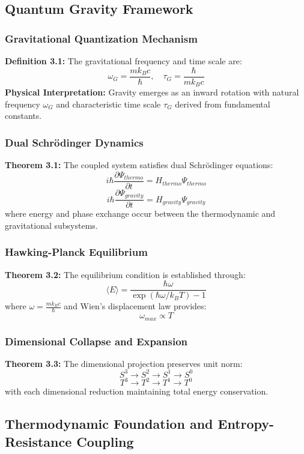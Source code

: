﻿\documentclass[12pt]{article}
\begin{document}
\subsection{Quantum Gravity Framework}

\subsubsection{Gravitational Quantization Mechanism}
\textbf{Definition 3.1:} The gravitational frequency and time scale are:
$$\omega_G = \frac{m k_B c}{\hbar}, \quad \tau_G = \frac{\hbar}{m k_B c}$$
\textbf{Physical Interpretation:} Gravity emerges as an inward rotation with natural frequency $\omega_G$ and characteristic time scale $\tau_G$ derived from fundamental constants.

\subsubsection{Dual Schr\"odinger Dynamics}
\textbf{Theorem 3.1:} The coupled system satisfies dual Schr\"odinger equations:
$$i\hbar \frac{\partial \Psi_{thermo}}{\partial t} = H_{thermo} \Psi_{thermo}$$
$$i\hbar \frac{\partial \Psi_{gravity}}{\partial t} = H_{gravity} \Psi_{gravity}$$
where energy and phase exchange occur between the thermodynamic and gravitational subsystems.

\subsubsection{Hawking-Planck Equilibrium}
\textbf{Theorem 3.2:} The equilibrium condition is established through:
$$\langle E \rangle = \frac{\hbar \omega}{\exp(\hbar \omega / k_B T) - 1}$$
where $\omega = \frac{m k_B c}{\hbar}$ and Wien's displacement law provides:
$$\omega_{max} \propto T$$

\subsubsection{Dimensional Collapse and Expansion}
\textbf{Theorem 3.3:} The dimensional projection preserves unit norm:
$$S^3 \rightarrow S^2 \rightarrow S^1 \rightarrow S^0$$
$$T^3 \rightarrow T^2 \rightarrow T^1 \rightarrow T^0$$
with each dimensional reduction maintaining total energy conservation.

\subsection{Thermodynamic Foundation and Entropy-Resistance Coupling}
\end{document}
